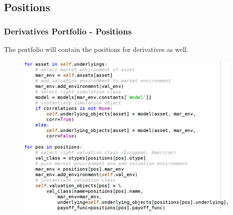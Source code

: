 \documentclass{beamer}
\begin{document}
\subsection{Positions}
\begin{frame}
\frametitle{Derivatives Portfolio - Positions}
The portfolio will contain the positions for derivatives as well.
\begin{figure}[H]
	\includegraphics[scale=0.37]{derivatives_portfolio_underlying_positions.png}
\end{figure}
\end{frame}
\end{document}
